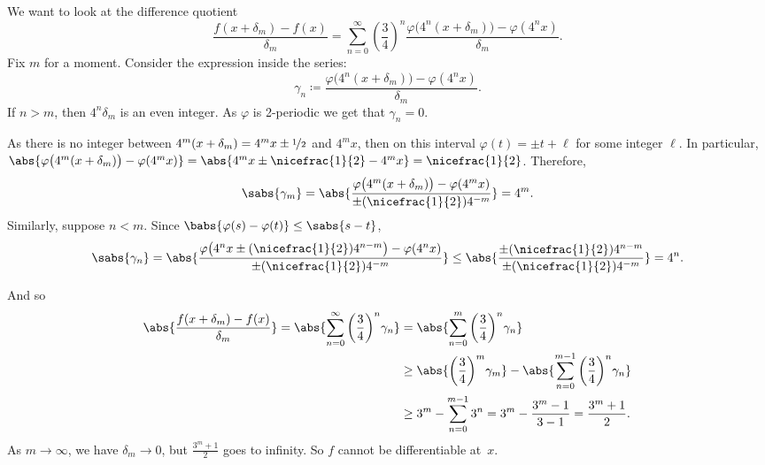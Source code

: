 \begin{example}
We want to look at the difference quotient
\begin{equation*}
\frac{f(x+\delta_m)-f(x)}{\delta_m}
=
\sum_{n=0}^\infty 
{\left(\frac{3}{4}\right)}^n
\frac{\varphi\bigl(4^n(x+\delta_m)\bigr)-\varphi(4^nx)}{\delta_m} .
\end{equation*}
Fix $m$ for a moment.  Consider the expression inside the series:
\begin{equation*}
\gamma_{n} \coloneqq
\frac{\varphi\bigl(4^n(x+\delta_m)\bigr)-\varphi(4^nx)}{\delta_m} .
\end{equation*}
If $n > m$, then $4^n\delta_m$ is an even integer.  As $\varphi$
is 2-periodic we get that $\gamma_n = 0$.

As there is no integer between 
$4^m(x+\delta_m) = 4^m x\pm\nicefrac{1}{2}$ and $4^m x$, then on this interval
$\varphi(t) = \pm t + \ell$ for some integer $\ell$.
In particular,
$\abs{\varphi\bigl(4^m(x+ \delta_m)\bigr)-\varphi(4^mx)} =
\abs{4^mx\pm\nicefrac{1}{2}-4^mx} = \nicefrac{1}{2}$.  Therefore,
\begin{equation*}
\sabs{\gamma_m} =
\abs{
\frac{\varphi\bigl(4^m(x+\delta_m)\bigr)-\varphi(4^mx)}{\pm (\nicefrac{1}{2}) 4^{-m}}
}
= 4^m .
\end{equation*}
Similarly, suppose $n < m$.  Since $\babs{\varphi(s) -\varphi(t)} \leq
\sabs{s-t}$,
\begin{equation*}
\sabs{\gamma_n} =
\abs{\frac{\varphi\bigl(4^nx\pm(\nicefrac{1}{2})4^{n-m}\bigr)-\varphi(4^nx)}{\pm
(\nicefrac{1}{2}) 4^{-m}}}
\leq
\abs{\frac{\pm(\nicefrac{1}{2})4^{n-m}}{\pm (\nicefrac{1}{2}) 4^{-m}}} = 4^n
.
\end{equation*}

And so
\begin{equation*}
\begin{split}
\abs{
\frac{f(x+\delta_m)-f(x)}{\delta_m}
}
=
\abs{
\sum_{n=0}^\infty 
{\left(\frac{3}{4}\right)}^n
\gamma_n
}
& =
\abs{
\sum_{n=0}^m 
{\left(\frac{3}{4}\right)}^n
\gamma_n
}
\\
& \geq
\abs{
{\left(\frac{3}{4}\right)}^m
\gamma_m}
-
\abs{
\sum_{n=0}^{m-1} 
{\left(\frac{3}{4}\right)}^n
\gamma_n
}
\\
& \geq
3^m
-
\sum_{n=0}^{m-1} 
3^n
=
3^m
-
\frac{3^{m}-1}{3-1}
=
\frac{3^m +1}{2} .
\end{split}
\end{equation*}
As $m \to \infty$, we have
$\delta_m \to 0$, but $\frac{3^m+1}{2}$
goes to infinity.  So $f$ cannot be differentiable at~$x$.
\end{example}

